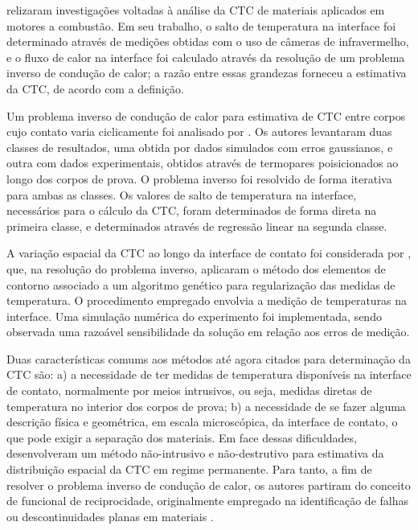 \cite{artigo_fieberg} relizaram investigações voltadas à análise da CTC de materiais aplicados em motores a combustão. Em seu trabalho, o salto de temperatura
na interface foi determinado através de medições obtidas com o uso de câmeras de infravermelho, e o fluxo de calor na interface foi calculado
através da resolução de um problema inverso de condução de calor; a razão entre essas grandezas forneceu a estimativa da CTC, de acordo
com a definição.   

Um problema inverso de condução de calor para estimativa de CTC entre corpos cujo contato varia ciclicamente foi analisado por \cite{artigo_shoj}.
Os autores levantaram duas classes de resultados, uma obtida por dados simulados com erros gaussianos, e outra com dados experimentais, obtidos através
de termopares poisicionados ao longo dos corpos de prova. O problema
inverso foi resolvido de forma iterativa para ambas as classes. Os valores de salto de temperatura na interface, necessários para o cálculo da CTC,
foram determinados de forma direta na primeira classe, e determinados através de regressão linear na segunda classe. 

A variação espacial da CTC ao longo da interface de contato foi considerada por \cite{artigo_gill}, que, na resolução do problema inverso, aplicaram
o método dos elementos de contorno \citep{livro_bem} associado a um algoritmo genético para regularização das medidas de temperatura. O procedimento empregado
envolvia a medição de temperaturas na interface. Uma simulação numérica do experimento foi implementada, sendo observada uma razoável sensibilidade
da solução em relação aos erros de medição. 

Duas características comums aos métodos até agora citados para determinação da CTC são: a) a necessidade de ter medidas de temperatura disponíveis na interface de contato,
normalmente por meios intrusivos, ou seja, medidas diretas de temperatura no interior dos corpos de prova; b) a necessidade de se fazer alguma descrição física e geométrica, em
escala microscópica, da interface de contato, o que pode exigir a separação dos materiais. Em face dessas dificuldades, \cite{reciproc_3} desenvolveram
um método não-intrusivo e não-destrutivo para estimativa da distribuição espacial da CTC em regime permanente. Para tanto, a fim de resolver o problema inverso de condução de calor, os autores partiram do conceito de funcional de reciprocidade, originalmente
empregado na identificação de falhas ou descontinuidades planas em materiais \citep{artigo_andrieux}.

